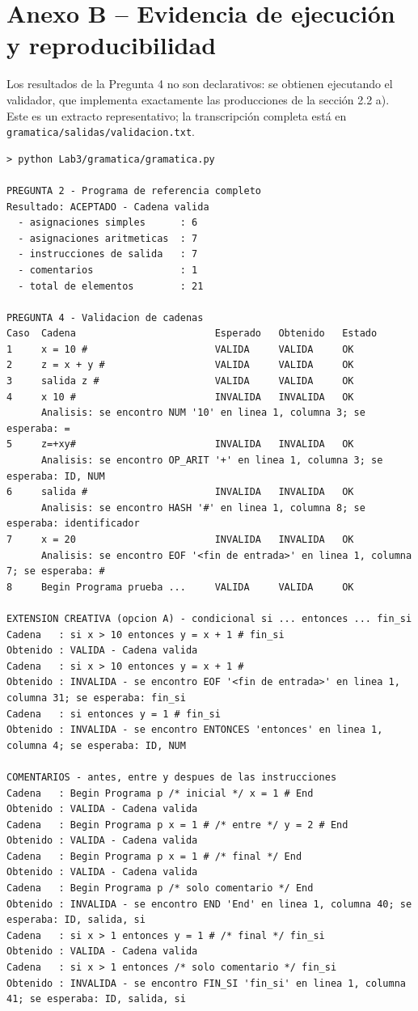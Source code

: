 \documentclass[11pt,letterpaper]{article}
\begin{document}
\clearpage
\section*{Anexo B -- Evidencia de ejecución y reproducibilidad}

Los resultados de la Pregunta 4 no son declarativos: se obtienen ejecutando el validador, que implementa
exactamente las producciones de la sección 2.2 a). Este es un extracto representativo; la transcripción
completa está en \lstinline|gramatica/salidas/validacion.txt|.

\begin{lstlisting}
> python Lab3/gramatica/gramatica.py

PREGUNTA 2 - Programa de referencia completo
Resultado: ACEPTADO - Cadena valida
  - asignaciones simples      : 6
  - asignaciones aritmeticas  : 7
  - instrucciones de salida   : 7
  - comentarios               : 1
  - total de elementos        : 21

PREGUNTA 4 - Validacion de cadenas
Caso  Cadena                        Esperado   Obtenido   Estado
1     x = 10 #                      VALIDA     VALIDA     OK
2     z = x + y #                   VALIDA     VALIDA     OK
3     salida z #                    VALIDA     VALIDA     OK
4     x 10 #                        INVALIDA   INVALIDA   OK
      Analisis: se encontro NUM '10' en linea 1, columna 3; se esperaba: =
5     z=+xy#                        INVALIDA   INVALIDA   OK
      Analisis: se encontro OP_ARIT '+' en linea 1, columna 3; se esperaba: ID, NUM
6     salida #                      INVALIDA   INVALIDA   OK
      Analisis: se encontro HASH '#' en linea 1, columna 8; se esperaba: identificador
7     x = 20                        INVALIDA   INVALIDA   OK
      Analisis: se encontro EOF '<fin de entrada>' en linea 1, columna 7; se esperaba: #
8     Begin Programa prueba ...     VALIDA     VALIDA     OK

EXTENSION CREATIVA (opcion A) - condicional si ... entonces ... fin_si
Cadena   : si x > 10 entonces y = x + 1 # fin_si
Obtenido : VALIDA - Cadena valida
Cadena   : si x > 10 entonces y = x + 1 #
Obtenido : INVALIDA - se encontro EOF '<fin de entrada>' en linea 1, columna 31; se esperaba: fin_si
Cadena   : si entonces y = 1 # fin_si
Obtenido : INVALIDA - se encontro ENTONCES 'entonces' en linea 1, columna 4; se esperaba: ID, NUM

COMENTARIOS - antes, entre y despues de las instrucciones
Cadena   : Begin Programa p /* inicial */ x = 1 # End
Obtenido : VALIDA - Cadena valida
Cadena   : Begin Programa p x = 1 # /* entre */ y = 2 # End
Obtenido : VALIDA - Cadena valida
Cadena   : Begin Programa p x = 1 # /* final */ End
Obtenido : VALIDA - Cadena valida
Cadena   : Begin Programa p /* solo comentario */ End
Obtenido : INVALIDA - se encontro END 'End' en linea 1, columna 40; se esperaba: ID, salida, si
Cadena   : si x > 1 entonces y = 1 # /* final */ fin_si
Obtenido : VALIDA - Cadena valida
Cadena   : si x > 1 entonces /* solo comentario */ fin_si
Obtenido : INVALIDA - se encontro FIN_SI 'fin_si' en linea 1, columna 41; se esperaba: ID, salida, si


\end{lstlisting}
\end{document}
